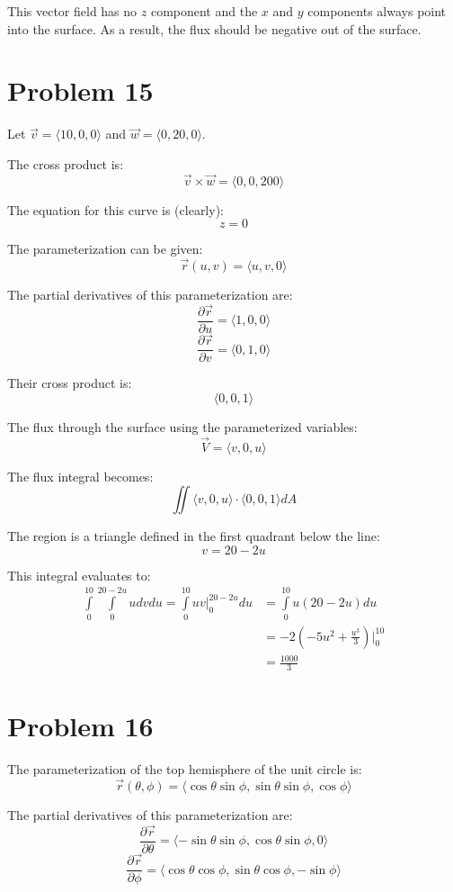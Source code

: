\documentclass{article}
\begin{document}
This vector field has no $z$ component and the $x$ and $y$ components always
point into the surface. As a result, the flux should be negative out of the
surface.

\section*{Problem 15}

Let $\vec{v} = \langle 10, 0, 0 \rangle$ and $\vec{w} = \langle 0, 20, 0
\rangle$.

The cross product is:
$$ \vec{v} \times \vec{w} = \langle 0, 0, 200 \rangle $$

The equation for this curve is (clearly):
$$ z = 0 $$

The parameterization can be given:
$$ \vec{r}(u, v) = \langle u, v, 0 \rangle $$

The partial derivatives of this parameterization are:
$$ \frac{\partial \vec{r}}{\partial u} = \langle 1, 0, 0 \rangle $$
$$ \frac{\partial \vec{r}}{\partial v} = \langle 0, 1, 0 \rangle $$

Their cross product is:
$$ \langle 0, 0, 1 \rangle $$

The flux through the surface using the parameterized variables:
$$ \vec{V} = \langle v, 0, u \rangle $$

The flux integral becomes:
$$ \iint \langle v, 0, u \rangle \cdot \langle 0, 0, 1 \rangle dA $$

The region is a triangle defined in the first quadrant below the line:
$$ v = 20 - 2u $$

This integral evaluates to:
\begin{align*}
 \int\limits_0^{10} \int\limits_0^{20-2u} u dv du = \int\limits_0^{10} u v
  \bigg\vert_0^{20-2u} du &= \int\limits_0^{10} u(20 - 2u) du\\ &= -2 \left( -5 u^2 +
  \frac{u^3}{3} \right) \bigg\vert_0^{10}\\ &= \frac{1000}{3}
\end{align*}

\section*{Problem 16}
The parameterization of the top hemisphere of the unit circle is:
$$ \vec{r}(\theta, \phi) = \langle \cos \theta \sin \phi, \sin \theta \sin \phi,
\cos \phi \rangle $$

The partial derivatives of this parameterization are:
$$ \frac{\partial \vec{r}}{\partial \theta} = \langle -\sin \theta \sin \phi,
\cos \theta \sin \phi, 0 \rangle $$
$$ \frac{\partial \vec{r}}{\partial \phi} = \langle \cos \theta \cos \phi, \sin
\theta \cos \phi, -\sin \phi \rangle $$
\end{document}
